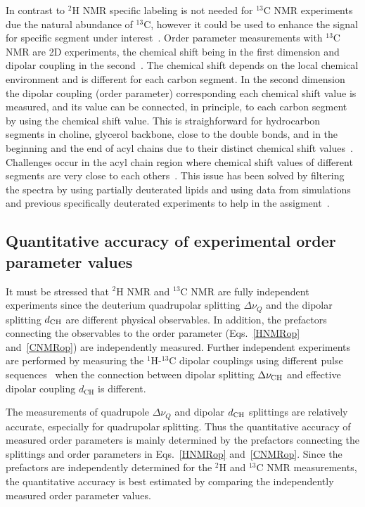 \documentclass[aps,prl,superscriptaddress,twocolumn]{revtex4}
\begin{document}
In contrast to $^2$H NMR specific labeling is not needed for $^{13}$C NMR experiments due the 
natural abundance of $^{13}$C, however it could be used to enhance the signal for specific 
segment under interest~\cite{sivanandam09}. Order parameter measurements with $^{13}$C NMR are
2D experiments, the chemical shift being in the first dimension and dipolar coupling 
in the second~\cite{hong95a,gross97,dvinskikh05a,ferreira13}. The chemical shift depends on the local chemical environment and 
is different for each carbon segment. In the second dimension the dipolar coupling
(order parameter) corresponding each chemical shift value is measured, and its value 
can be connected, in principle, to each carbon segment by using the chemical shift value.  
This is straighforward for hydrocarbon segments in choline, glycerol backbone, close to the 
double bonds, and in the beginning and the end of acyl chains due to their distinct chemical 
shift values~\cite{hong95a,gross97,dvinskikh05a,ferreira13,leftin14}.
Challenges occur in the acyl chain region where chemical shift values 
of different segments are very close to each others~\cite{hong95a,gross97,dvinskikh05a,ferreira13,leftin14}. 
This issue has been solved by filtering the spectra by using partially deuterated lipids \cite{ferreira13}
and using data from simulations and previous specifically deuterated experiments to help in 
the assigment~\cite{ferreira13,leftin14}. 


\subsection{Quantitative accuracy of experimental order parameter values}\label{QUANTaccuracySECTION}

It must be stressed that $^2$H NMR and $^{13}$C NMR are fully independent experiments since the deuterium quadrupolar splitting $\Delta \nu_Q$
and the dipolar splitting $d_{{\rm CH}}$ are different physical observables. In addition, the prefactors connecting the observables to the order 
parameter (Eqs.~\ref{HNMRop} and~\ref{CNMRop}) are independently measured. Further independent experiments are performed 
by measuring the $^1$H-$^{13}$C dipolar couplings using different pulse sequences~\cite{hong95a,gross97,dvinskikh05a,ferreira13} 
when the connection between dipolar splitting $\Delta \nu_{{\rm CH}}$ and effective dipolar coupling $d_\mathrm{CH}$ is different.

The measurements of quadrupole $\Delta \nu_Q$ and dipolar $d_{{\rm CH}}$ splittings are relatively accurate, especially for quadrupolar splitting.
Thus the quantitative accuracy of measured order parameters is mainly determined by the  
prefactors connecting the splittings and order parameters in Eqs.~\ref{HNMRop} and~\ref{CNMRop}. 
Since the prefactors are independently determined for the $^2$H and $^{13}$C NMR measurements,
the quantitative accuracy is best estimated by comparing the independently measured order parameter values.
\end{document}
